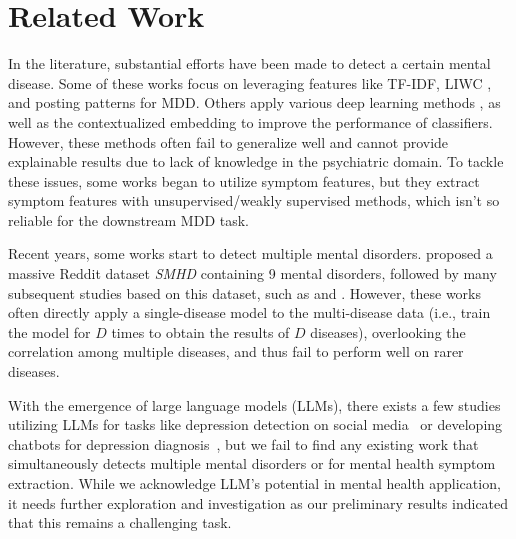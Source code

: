 \section{Related Work}

In the literature, substantial efforts have been made to detect a certain mental disease. Some of these works focus on leveraging features like TF-IDF,  LIWC \citep{pennebaker2001linguistic}, and posting patterns \citep{trotzek2018utilizing, losada2016test} for MDD. 
Others apply various deep learning methods \citep{yates2017depression, gui2019cooperative}, as well as the contextualized embedding \citep{ji2021mentalbert, jiang2020detection} to improve the performance of classifiers. However, these methods often fail to generalize well \citep{harrigian2020models} and cannot provide explainable results due to lack of knowledge in the psychiatric domain. 
To tackle these issues, some works \citep{lee2021micromodels, nguyen2022improving} began to utilize symptom features, but they extract symptom features with unsupervised/weakly supervised methods, which isn't so reliable for the downstream MDD task. 

Recent years, some works start to detect multiple mental disorders. \citet{cohan2018smhd} proposed a massive Reddit dataset \textit{SMHD} containing 9 mental disorders, followed by many subsequent studies based on this dataset, such as \citet{sekulic2019adapting} and \citet{Zhang2022SymptomIF}. However, these works often directly apply a single-disease model to the multi-disease data (i.e., train the model for $D$ times to obtain the results of $D$ diseases), overlooking the correlation among multiple diseases, and thus fail to perform well on rarer diseases.

With the emergence of large language models (LLMs), there exists a few studies utilizing LLMs for tasks like depression detection on social media~\cite{lamichhane2023evaluation, qin2023read} or developing chatbots for depression diagnosis~\cite{chen2023llmempowered}, but we fail to find any existing work that simultaneously detects multiple mental disorders or for mental health symptom extraction. While we acknowledge LLM's potential in mental health application, it needs further exploration and investigation as our preliminary results indicated that this remains a challenging task.  

